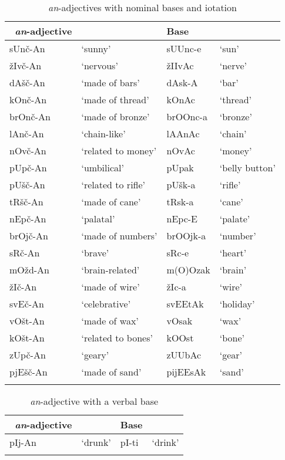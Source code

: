 \documentclass[output=paper]{langsci/langscibook}
\begin{document}
\begin{table}
\caption{\textit{an}-adjectives with nominal bases and iotation} 
\label{tabapp2}
\begin{tabular}{ l l l l}
\lsptoprule  
\ \textit{an}-adjective &  & Base & 
\\ 
\hline
sUnč-An & `sunny' & sUUnc-e & `sun'
\\
žIvč-An & `nervous' & žIIvAc & `nerve'
\\
dAšč-An & `made of bars' & dAsk-A & `bar' \\
kOnč-An & `made of thread' & kOnAc & `thread' \\
brOnč-An & `made of bronze' & brOOnc-a & `bronze' \\
lAnč-An & `chain-like' & lAAnAc & `chain'\\
nOvč-An & `related to money' & nOvAc & `money'\\
pUpč-An
 & `umbilical' & pUpak & `belly button'\\
pUšč-An & `related to rifle' & pUšk-a & `rifle' \\ 
tRšč-An & `made of cane' & tRsk-a & `cane'\\
nEpč-An & `palatal' & nEpc-E & `palate'\\
brOjč-An & `made of numbers' & brOOjk-a & `number'\\
sRč-An & `brave' & sRc-e & `heart'
\\
mOžd-An & `brain-related' & m(O)Ozak & `brain'
\\
žIč-An & `made of wire' & žIc-a & `wire'
\\
svEč-An & `celebrative' & svEEtAk & `holiday'
\\
vOšt-An & `made of wax' & vOsak & `wax'
\\
kOšt-An & `related to bones' & kOOst & `bone'
\\
zUpč-An & `geary' & zUUbAc & `gear'
\\
pjEšč-An & `made of sand' & pijEEsAk & `sand'
\\
 \lspbottomrule
 \end{tabular}
\end{table} 

\begin{table}
\caption{\textit{an}-adjective with a verbal base}
\label{tabapp3}
 \begin{tabular}{ l l l l}
\lsptoprule  
\ \textit{an}-adjective &  & Base & 
\\ 
\hline
pIj-An & `drunk' & pI-ti & `drink'
\\
 \lspbottomrule
 \end{tabular}
\end{table} 
\end{document}
